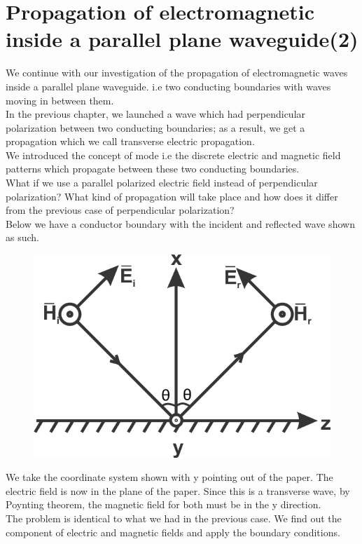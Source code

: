 \chapter{Propagation of electromagnetic inside a parallel plane waveguide(2)}
We continue with our investigation of the propagation of electromagnetic waves inside a parallel plane waveguide. i.e two conducting boundaries with waves moving in between them.\\
In the previous chapter, we launched a wave which had perpendicular polarization between two conducting boundaries; as a result, we get a propagation which we call transverse electric propagation. \\
We introduced the concept of mode i.e the discrete electric and magnetic field patterns which propagate between these two conducting boundaries.\\ What if we use a parallel polarized electric field instead of perpendicular polarization? What kind of propagation will take place and how does it differ from the previous case of perpendicular polarization?\\ Below we have a conductor boundary with the incident and reflected wave shown as such.
\begin{figure}[h]
\centering
\includegraphics[scale=1]{./graphics/silas1}
\caption{}
\end{figure}
We take the coordinate system shown with y pointing out of the paper. The electric field is now in the plane of the paper. Since this is a transverse wave, by Poynting theorem, the magnetic field for both must be in the y direction. \\
The problem is identical to what we had in the previous case. We find out the component of electric and magnetic fields and apply the boundary conditions.
